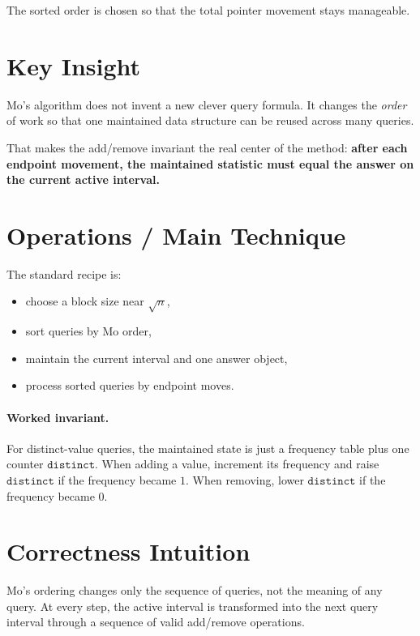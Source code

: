 The sorted order is chosen so that the total pointer movement stays manageable.

\section*{Key Insight}

Mo's algorithm does not invent a new clever query formula. It changes the \emph{order} of work so that one maintained
data structure can be reused across many queries.

That makes the add/remove invariant the real center of the method:
\textbf{after each endpoint movement, the maintained statistic must equal the answer on the current active interval.}

\section*{Operations / Main Technique}

The standard recipe is:

\begin{itemize}
  \item choose a block size near \(\sqrt{n}\),
  \item sort queries by Mo order,
  \item maintain the current interval and one answer object,
  \item process sorted queries by endpoint moves.
\end{itemize}

\paragraph{Worked invariant.}
For distinct-value queries, the maintained state is just a frequency table plus one counter \(\texttt{distinct}\). When
adding a value, increment its frequency and raise \(\texttt{distinct}\) if the frequency became \(1\). When removing,
lower \(\texttt{distinct}\) if the frequency became \(0\).

\section*{Correctness Intuition}

Mo's ordering changes only the sequence of queries, not the meaning of any query. At every step, the active interval is
transformed into the next query interval through a sequence of valid add/remove operations.

